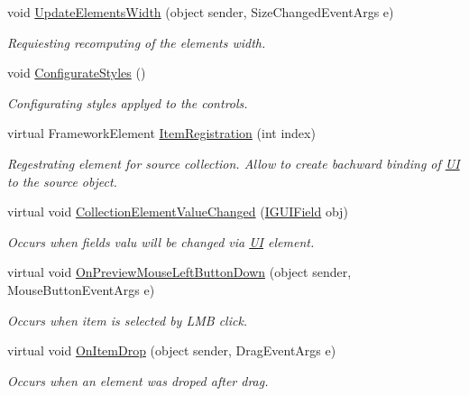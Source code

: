 \begin{DoxyCompactItemize}
\item 
void \mbox{\hyperlink{class_wpf_handler_1_1_u_i_1_1_controls_1_1_collection_control_a6df510adc9706b127f2179a6cc123799}{Update\+Elements\+Width}} (object sender, Size\+Changed\+Event\+Args e)
\begin{DoxyCompactList}\small\item\em Requiesting recomputing of the elements width. \end{DoxyCompactList}\item 
void \mbox{\hyperlink{class_wpf_handler_1_1_u_i_1_1_controls_1_1_collection_control_a5fdb64f8a451f387f2a36686f0fec014}{Configurate\+Styles}} ()
\begin{DoxyCompactList}\small\item\em Configurating styles applyed to the controls. \end{DoxyCompactList}\item 
virtual Framework\+Element \mbox{\hyperlink{class_wpf_handler_1_1_u_i_1_1_controls_1_1_collection_control_af375cbcb4d351b4d104b2706d39b8303}{Item\+Registration}} (int index)
\begin{DoxyCompactList}\small\item\em Regestrating element for source collection. Allow to create bachward binding of \mbox{\hyperlink{namespace_wpf_handler_1_1_u_i}{UI}} to the source object. \end{DoxyCompactList}\item 
virtual void \mbox{\hyperlink{class_wpf_handler_1_1_u_i_1_1_controls_1_1_collection_control_a2372fa8b10c175bb81d5901f36cbf8f7}{Collection\+Element\+Value\+Changed}} (\mbox{\hyperlink{interface_wpf_handler_1_1_u_i_1_1_auto_layout_1_1_i_g_u_i_field}{I\+G\+U\+I\+Field}} obj)
\begin{DoxyCompactList}\small\item\em Occurs when field\textquotesingle{}s valu will be changed via \mbox{\hyperlink{namespace_wpf_handler_1_1_u_i}{UI}} element. \end{DoxyCompactList}\item 
virtual void \mbox{\hyperlink{class_wpf_handler_1_1_u_i_1_1_controls_1_1_collection_control_ad6c991f82c204e789f32f21d28d48524}{On\+Preview\+Mouse\+Left\+Button\+Down}} (object sender, Mouse\+Button\+Event\+Args e)
\begin{DoxyCompactList}\small\item\em Occurs when item is selected by L\+MB click. \end{DoxyCompactList}\item 
virtual void \mbox{\hyperlink{class_wpf_handler_1_1_u_i_1_1_controls_1_1_collection_control_ae52c8e47654ca10e714a1e87a193331b}{On\+Item\+Drop}} (object sender, Drag\+Event\+Args e)
\begin{DoxyCompactList}\small\item\em Occurs when an element was droped after drag. \end{DoxyCompactList}\end{DoxyCompactItemize}
